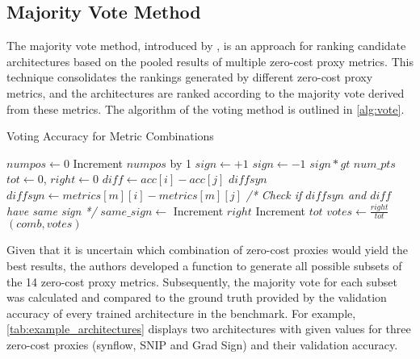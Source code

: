 \subsection{Majority Vote Method}\label{subsec:vote}

The majority vote method, introduced by \cite{abdelfattah2021zero}, is an approach for ranking candidate architectures based on the pooled results of multiple zero-cost proxy metrics. This technique consolidates the rankings generated by different zero-cost proxy metrics, and the architectures are ranked according to the majority vote derived from these metrics. The algorithm of the voting method is outlined in \cref{alg:vote}. 
\clearpage

\begin{algorithm}[h!]
\caption{Voting Accuracy for Metric Combinations}\label{alg:vote}
\begin{algorithmic}[1]
    \State $numpos \leftarrow 0$ 
            \State Increment $numpos$ by 1
        \EndIf
    \EndFor
        \State $sign \leftarrow +1$
    \Else
        \State $sign \leftarrow -1$
    \EndIf
    \State \Return $sign * gt$ 
\EndFunction
\vspace{1em}
    \State $num\_pts$ 
    \State $tot \leftarrow 0$, $right \leftarrow 0$
        \State $diff \leftarrow acc[i] - acc[j]$
            \State $diffsyn$ 
                \State $diffsyn \leftarrow metrics[m][i] - metrics[m][j]$
            \EndFor
            \State \textit{/* Check if $diffsyn$ and $diff$ have same sign */}
            \State $same\_sign \leftarrow$ 
                \State Increment $right$ 
            \EndIf
            \State Increment $tot$
        \EndIf
    \EndFor
    \State $votes \leftarrow \frac{right}{tot}$ 
    \State \Return $(comb, votes)$
\EndFunction
\end{algorithmic}
\end{algorithm}


Given that it is uncertain which combination of zero-cost proxies would yield the best results, the authors developed a function to generate all possible subsets of the 14 zero-cost proxy metrics. Subsequently, the majority vote for each subset was calculated and compared to the ground truth provided by the validation accuracy of every trained architecture in the benchmark. For example, \cref{tab:example_architectures} displays two architectures with given values for three zero-cost proxies (synflow, SNIP and Grad Sign) and their validation accuracy. 

